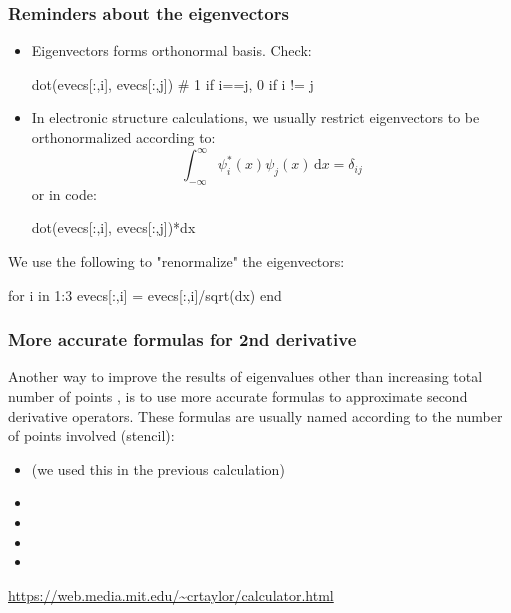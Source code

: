 \begin{frame}[fragile]
\frametitle{Reminders about the eigenvectors}

\begin{itemize}
%
\item Eigenvectors forms orthonormal basis. Check:
\begin{juliacode}
dot(evecs[:,i], evecs[:,j]) # 1 if i==j, 0 if i != j
\end{juliacode}
%
\item In electronic structure calculations, we usually restrict eigenvectors to be
orthonormalized according to:
\begin{equation*}
\int_{-\infty}^{\infty} \psi^{*}_{i}(x) \psi_{j}(x) \, \mathrm{d}x = \delta_{ij}
\end{equation*}
or in code:
\begin{juliacode}
dot(evecs[:,i], evecs[:,j])*dx
\end{juliacode}
%
\end{itemize}

We use the following to "renormalize" the eigenvectors:
\begin{juliacode}
for i in 1:3
    evecs[:,i] = evecs[:,i]/sqrt(dx)
end
\end{juliacode}

\end{frame}


\begin{frame}[fragile]
\frametitle{More accurate formulas for 2nd derivative}

Another way to improve the results of eigenvalues other than increasing total number
of points , is to use more accurate formulas to approximate
second derivative operators. These formulas are usually named according to
the number of points involved (stencil):
\begin{itemize}
\item {} (we used this in the previous calculation)
\item {}
\item {}
\item {}
\item {}
\end{itemize}

{\footnotesize \url{https://web.media.mit.edu/~crtaylor/calculator.html}}

\end{frame}


